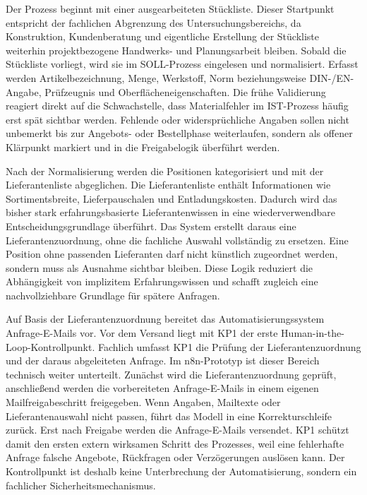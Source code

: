\documentclass[a4paper,12pt]{article}
\begin{document}
Der Prozess beginnt mit einer ausgearbeiteten Stückliste. Dieser Startpunkt entspricht der fachlichen Abgrenzung des Untersuchungsbereichs, da Konstruktion, Kundenberatung und eigentliche Erstellung der Stückliste weiterhin projektbezogene Handwerks- und Planungsarbeit bleiben. Sobald die Stückliste vorliegt, wird sie im SOLL-Prozess eingelesen und normalisiert. Erfasst werden Artikelbezeichnung, Menge, Werkstoff, Norm beziehungsweise DIN-/EN-Angabe, Prüfzeugnis und Oberflächeneigenschaften. Die frühe Validierung reagiert direkt auf die Schwachstelle, dass Materialfehler im IST-Prozess häufig erst spät sichtbar werden. Fehlende oder widersprüchliche Angaben sollen nicht unbemerkt bis zur Angebots- oder Bestellphase weiterlaufen, sondern als offener Klärpunkt markiert und in die Freigabelogik überführt werden.

Nach der Normalisierung werden die Positionen kategorisiert und mit der Lieferantenliste abgeglichen. Die Lieferantenliste enthält Informationen wie Sortimentsbreite, Lieferpauschalen und Entladungskosten. Dadurch wird das bisher stark erfahrungsbasierte Lieferantenwissen in eine wiederverwendbare Entscheidungsgrundlage überführt. Das System erstellt daraus eine Lieferantenzuordnung, ohne die fachliche Auswahl vollständig zu ersetzen. Eine Position ohne passenden Lieferanten darf nicht künstlich zugeordnet werden, sondern muss als Ausnahme sichtbar bleiben. Diese Logik reduziert die Abhängigkeit von implizitem Erfahrungswissen und schafft zugleich eine nachvollziehbare Grundlage für spätere Anfragen.

Auf Basis der Lieferantenzuordnung bereitet das Automatisierungssystem Anfrage-E-Mails vor. Vor dem Versand liegt mit KP1 der erste Human-in-the-Loop-Kontrollpunkt. Fachlich umfasst KP1 die Prüfung der Lieferantenzuordnung und der daraus abgeleiteten Anfrage. Im n8n-Prototyp ist dieser Bereich technisch weiter unterteilt. Zunächst wird die Lieferantenzuordnung geprüft, anschließend werden die vorbereiteten Anfrage-E-Mails in einem eigenen Mailfreigabeschritt freigegeben. Wenn Angaben, Mailtexte oder Lieferantenauswahl nicht passen, führt das Modell in eine Korrekturschleife zurück. Erst nach Freigabe werden die Anfrage-E-Mails versendet. KP1 schützt damit den ersten extern wirksamen Schritt des Prozesses, weil eine fehlerhafte Anfrage falsche Angebote, Rückfragen oder Verzögerungen auslösen kann. Der Kontrollpunkt ist deshalb keine Unterbrechung der Automatisierung, sondern ein fachlicher Sicherheitsmechanismus.
\end{document}

